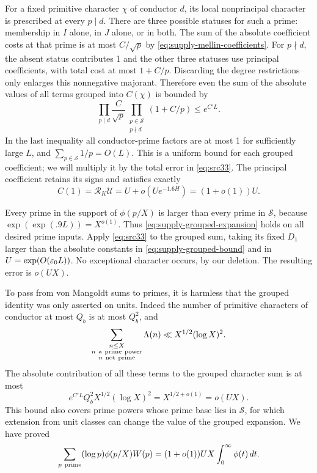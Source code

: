 For a fixed primitive character \(\chi\) of conductor \(d\),
its local nonprincipal character is prescribed at every \(p\mid d\).
There are three possible statuses for such a prime: membership
in \(I\) alone, in \(J\) alone, or in both.
The sum of the absolute coefficient costs at that prime is
at most \(C/\sqrt p\) by \eqref{eq:supply-mellin-coefficients}.
For \(p\nmid d\), the absent status contributes 1 and the other
three statuses use principal coefficients, with total cost
at most \(1+C/p\).
Discarding the degree restrictions only enlarges this nonnegative
majorant. Therefore even the sum of the absolute values of all
terms grouped into \(C(\chi)\) is bounded by
\begin{equation}\label{eq:supply-grouped-bound}
 \prod_{p\mid d}\frac C{\sqrt p}
       \prod_{\substack{p\in\mathcal S\\p\nmid d}}(1+C/p)
 \le e^{C'L}.
\end{equation}
In the last inequality all conductor-prime factors are at most 1
for sufficiently large \(L\), and \(\sum_{p\in\mathcal S}1/p=O(L)\).
This is a uniform bound for each grouped coefficient; we will
multiply it by the total error in \eqref{eq:src33}.
The principal coefficient retains its signs and satisfies exactly
\[
 C(1)=\mathcal R_K\mathcal U
      =U+o(Ue^{-1.6H})=(1+o(1))U.
\]

Every prime in the support of \(\phi(p/X)\) is larger than every
prime in \(\mathcal S\), because
\(\exp(\exp(.9L))=X^{o(1)}\). Thus
\eqref{eq:supply-grouped-expansion} holds on all desired prime
inputs. Apply \eqref{eq:src33} to the grouped sum, taking its fixed
\(D_1\) larger than the absolute constants in
\eqref{eq:supply-grouped-bound} and in \(U=\exp(O(\varepsilon_0L))\).
No exceptional character occurs, by our deletion.
The resulting error is \(o(UX)\).

To pass from von Mangoldt sums to primes, it is harmless that the
grouped identity was only asserted on units. Indeed the number
of primitive characters of conductor at most \(Q_b\) is at most
\(Q_b^2\), and
\[
 \sum_{\substack{n\le X\\n\ {\rm a\ prime\ power}\\
                              n\ {\rm not\ prime}}}\Lambda(n)
 \ll X^{1/2}(\log X)^2.
\]
The absolute contribution of all these terms to the grouped
character sum is at most
\[
 e^{C'L}Q_b^2 X^{1/2}(\log X)^2
       =X^{1/2+o(1)}=o(UX).
\]
This bound also covers prime powers whose prime base lies in
\(\mathcal S\), for which extension from unit classes can change
the value of the grouped expansion. We have proved
\begin{equation}\label{eq:src34}
 \sum_{p\ {\rm prime}}(\log p)\phi(p/X)W(p)
   =(1+o(1))UX\int_0^\infty\phi(t)\,dt.
\end{equation}

